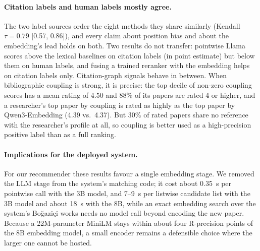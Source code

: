 \documentclass[sigconf,nonacm]{acmart}
\begin{document}
\paragraph{Citation labels and human labels mostly agree.}
The two label sources order the eight methods they share similarly (Kendall $\tau = 0.79$ [0.57, 0.86]), and every claim about position bias and about the embedding's lead holds on both.
Two results do not transfer: pointwise Llama scores above the lexical baselines on citation labels (in point estimate) but below them on human labels, and fusing a trained reranker with the embedding helps on citation labels only.
Citation-graph signals behave in between.
When bibliographic coupling is strong, it is precise: the top decile of non-zero coupling scores has a mean rating of 4.50 and 88\% of its papers are rated 4 or higher, and a researcher's top paper by coupling is rated as highly as the top paper by Qwen3-Embedding (4.39 vs.\ 4.37).
But 30\% of rated papers share no reference with the researcher's profile at all, so coupling is better used as a high-precision positive label than as a full ranking.

\paragraph{Implications for the deployed system.}
For our recommender these results favour a single embedding stage.
We removed the LLM stage from the system's matching code; it cost about 0.35~s per pointwise call with the 3B model, and 7--9~s per listwise candidate list with the 3B model and about 18~s with the 8B, while an exact embedding search over the system's Boğaziçi works needs no model call beyond encoding the new paper.
Because a 22M-parameter MiniLM stays within about four R-precision points of the 8B embedding model, a small encoder remains a defensible choice where the larger one cannot be hosted.
\end{document}

